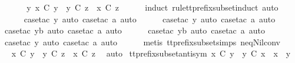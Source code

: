 \begin{isabellebody}
%
\isadelimproof
%
\endisadelimproof
%
\isatagproof
{}\isamarkupfalse%
\ {\isacharminus}\isanewline
\ \ \isamarkupfalse%
\ {\isachardoublequoteopen}{\isasymexists}\ y{\isachardot}\ x\ {\isasymlesssim}\isactrlsub C\ y\ {\isasymand}\ y\ {\isasymlesssim}\isactrlsub C\ z\ {\isasymLongrightarrow}\ x\ {\isasymlesssim}\isactrlsub C\ z{\isachardoublequoteclose}\isanewline
\ \ \ \ \isamarkupfalse%
\ {\isacharparenleft}induct\ rule{\isacharcolon}tt{\isacharunderscore}prefix{\isacharunderscore}subset{\isachardot}induct{\isacharcomma}\ auto{\isacharparenright}\isanewline
\ \ \ \ \isamarkupfalse%
\ {\isacharparenleft}case{\isacharunderscore}tac\ y{\isacharcomma}\ auto{\isacharcomma}\ case{\isacharunderscore}tac\ a{\isacharcomma}\ auto{\isacharparenright}\isanewline
\ \ \ \ \isamarkupfalse%
\ {\isacharparenleft}case{\isacharunderscore}tac\ y{\isacharcomma}\ auto{\isacharcomma}\ case{\isacharunderscore}tac\ a{\isacharcomma}\ auto{\isacharparenright}\isanewline
\ \ \ \ \isamarkupfalse%
\ {\isacharparenleft}case{\isacharunderscore}tac\ yb{\isacharcomma}\ auto{\isacharcomma}\ case{\isacharunderscore}tac\ a{\isacharcomma}\ auto{\isacharparenright}\isanewline
\ \ \ \ \isamarkupfalse%
\ {\isacharparenleft}case{\isacharunderscore}tac\ yb{\isacharcomma}\ auto{\isacharcomma}\ case{\isacharunderscore}tac\ a{\isacharcomma}\ auto{\isacharparenright}\isanewline
\ \ \ \ \isamarkupfalse%
\ {\isacharparenleft}case{\isacharunderscore}tac\ y{\isacharcomma}\ auto{\isacharcomma}\ case{\isacharunderscore}tac\ a{\isacharcomma}\ auto{\isacharparenright}{\isacharplus}\isanewline
\ \ \ \ \isamarkupfalse%
\ {\isacharparenleft}metis\ tt{\isacharunderscore}prefix{\isacharunderscore}subset{\isachardot}simps{\isacharparenleft}{}{\isacharparenright}\ neq{\isacharunderscore}Nil{\isacharunderscore}conv{\isacharparenright}\isanewline
\ \ \isamarkupfalse%
\ \isamarkupfalse%
\ {\isachardoublequoteopen}x\ {\isasymlesssim}\isactrlsub C\ y\ {\isasymLongrightarrow}\ y\ {\isasymlesssim}\isactrlsub C\ z\ {\isasymLongrightarrow}\ x\ {\isasymlesssim}\isactrlsub C\ z{\isachardoublequoteclose}\ \isamarkupfalse%
\ auto\isanewline
{}\isamarkupfalse%
%
\endisatagproof
{\isafoldproof}%
%
\isadelimproof
\isanewline
%
\endisadelimproof
\isanewline
{}\isamarkupfalse%
\ tt{\isacharunderscore}prefix{\isacharunderscore}subset{\isacharunderscore}antisym{\isacharcolon}\ {\isachardoublequoteopen}x\ {\isasymlesssim}\isactrlsub C\ y\ {\isasymLongrightarrow}\ y\ {\isasymlesssim}\isactrlsub C\ x\ {\isasymLongrightarrow}\ x\ {\isacharequal}\ y{\isachardoublequoteclose}\isanewline

\end{isabellebody}
